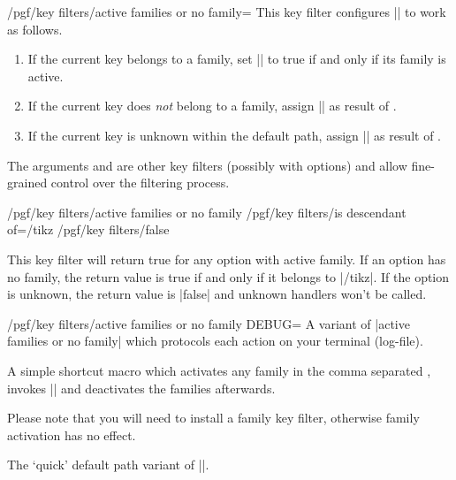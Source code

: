 \begin{key}{/pgf/key filters/active families or no family=}
	This key filter configures |\pgfkeysfiltered| to work as follows.
	\begin{enumerate} 
	\item If the current key belongs to a family, set |\ifpgfkeysfiltercontinue| to true if and only if its family is active.
	\item If the current key does \emph{not} belong to a family, assign |\ifpgfkeysfiltercontinue| as result of .
	\item If the current key is unknown within the default path, assign |\ifpgfkeysfiltercontinue| as result of .
	\end{enumerate}
	The arguments  and  are other key filters (possibly with options) and allow fine-grained control over the filtering process.
	\begin{codeexample}
	\pgfkeysinstallkeyfilter
		{/pgf/key filters/active families or no family}
		{{/pgf/key filters/is descendant of=/tikz}%
		 {/pgf/key filters/false}%
		}%
	\end{codeexample}
	This key filter will return true for any option with active family. If an option has no family, the return value is true if and only if it belongs to |/tikz|. If the option is unknown, the return value is |false| and unknown handlers won't be called.
\end{key}

\begin{key}{/pgf/key filters/active families or no family DEBUG=}
	A variant of |active families or no family| which protocols each action on your terminal (log-file).
\end{key}

\begin{command}{\pgfkeysactivatefamiliesandfilteroptions{}}%
	A simple shortcut macro which activates any family in the comma separated , invokes |\pgfkeysfiltered| and deactivates the families afterwards.

	Please note that you will need to install a family key filter, otherwise family activation has no effect.
\end{command}
\begin{command}{\pgfqkeysactivatefamiliesandfilteroptions{}}%
	The `quick' default path variant of |\pgfkeysactivatefamiliesandfilteroptions|.
\end{command}


